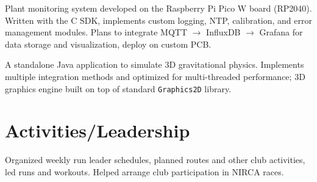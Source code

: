 \documentclass[10pt, roman]{moderncv}
\begin{document}
	{Plant monitoring system developed on the Raspberry Pi Pico W board (RP2040). Written with the C SDK, implements custom logging, NTP, calibration, and error management modules. Plans to integrate MQTT $\rightarrow$ InfluxDB $\rightarrow$ Grafana for data storage and visualization, deploy on custom PCB.}
	
	{A standalone Java application to simulate 3D gravitational physics. Implements multiple integration methods and optimized for multi-threaded performance; 3D graphics engine built on top of standard \texttt{Graphics2D} library.}

\section{Activities/Leadership}
	{Organized weekly run leader schedules, planned routes and other club activities, led runs and workouts. Helped arrange club participation in NIRCA races.}
\end{document}

